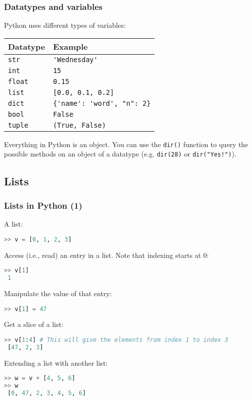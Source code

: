 \begin{frame}[fragile]
  \frametitle{Datatypes and variables}
  Python uses different types of variables:
      \begin{longtable}{l!{\vrule}l}
       Datatype        & Example \\ \hline
       \lstinline$str$    & \lstinline$'Wednesday'$ \\
       \lstinline$int$    & \lstinline$15$ \\
       \lstinline$float$  & \lstinline$0.15$ \\
       \lstinline$list$   & \lstinline$[0.0, 0.1, 0.2]$ \\
       \lstinline$dict$   & \lstinline${'name': 'word', "n": 2}$ \\
       \lstinline$bool$   & \lstinline$False$ \\
       \lstinline$tuple$  & \lstinline$(True, False)$ \\
     \end{longtable}
     \pause
     Everything in Python is an object. You can use the \lstinline$dir()$ function to query the possible methods on an object of a datatype (e.g. \lstinline$dir(28)$ or \lstinline$dir("Yes!")$).

 \end{frame}


 \subsection*{Lists}
 \begin{frame}[fragile]
   \frametitle{Lists in Python (1)}
   A list:
   \begin{lstlisting}[language=Python,numbers=none]
>> v = [0, 1, 2, 3]
   \end{lstlisting}\pause
   Access (i.e., read) an entry in a list. Note that indexing starts at 0:
   \begin{lstlisting}[language=Python,numbers=none]
>> v[1]
 1
   \end{lstlisting}\pause
   Manipulate the value of that entry:
   \begin{lstlisting}[language=Python,numbers=none]
>> v[1] = 47
   \end{lstlisting}\pause
   Get a slice of a list:
   \begin{lstlisting}[language=Python,numbers=none]
>> v[1:4] # This will give the elements from index 1 to index 3
 [47, 2, 3]
   \end{lstlisting}\pause
   Extending a list with another list:
   \begin{lstlisting}[language=Python,numbers=none]
>> w = v + [4, 5, 6]
>> w
 [0, 47, 2, 3, 4, 5, 6]
   \end{lstlisting}
 \end{frame}
 
